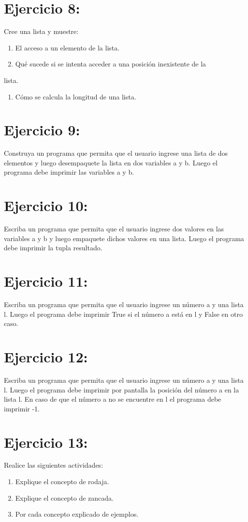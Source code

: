 \documentclass[11pt]{article}
\begin{document}
\section{Ejercicio 8:}
\label{sec:orga3b9a95}
Cree una lista y muestre:
\begin{enumerate}
\item El acceso a un elemento de la lista.
\item Qué sucede si se intenta acceder a una posición inexistente de la
\end{enumerate}
lista.
\begin{enumerate}
\item Cómo se calcula la longitud de una lista.
\end{enumerate}
\section{Ejercicio 9:}
\label{sec:org24a7ba5}
Construya un programa que permita que el usuario ingrese una
lista de dos elementos y luego desempaquete la lista en dos variables a
y b. Luego el programa debe imprimir las variables a y b.
\section{Ejercicio 10:}
\label{sec:orgd5582a3}
Escriba un programa que permita que el usuario ingrese dos
valores en las variables a y b y luego empaquete dichos valores en una
lista. Luego el programa debe imprimir la tupla resultado.
\section{Ejercicio 11:}
\label{sec:org455be60}
Escriba un programa que permita que el usuario ingrese un
número a y una lista l. Luego el programa debe imprimir True si el
número a está en l y False en otro caso.
\section{Ejercicio 12:}
\label{sec:orga519fc4}
Escriba un programa que permita que el usuario ingrese un
número a y una lista l. Luego el programa debe imprimir por pantalla
la posición del número a en la lista l. En caso de que el número a no se
encuentre en l el programa debe imprimir -1.
\section{Ejercicio 13:}
\label{sec:org43c934f}
Realice las siguientes actividades:
\begin{enumerate}
\item Explique el concepto de rodaja.
\item Explique el concepto de zancada.
\item Por cada concepto explicado de ejemplos.
\end{enumerate}
\end{document}
